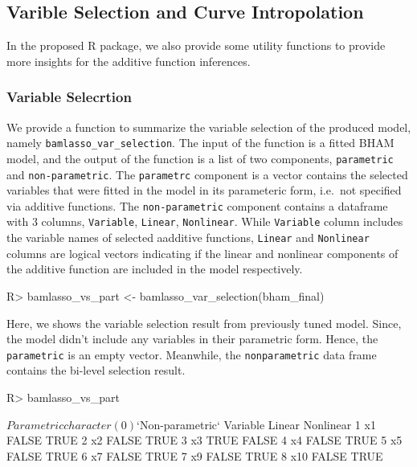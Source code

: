 \documentclass[
]{jss}
\begin{document}
\subsection{Varible Selection and Curve Intropolation}

In the proposed R package, we also provide some utility functions to
provide more insights for the additive function inferences.

\subsubsection{Variable Selecrtion}

We provide a function to summarize the variable selection of the
produced model, namely \texttt{bamlasso\_var\_selection}. The input of
the function is a fitted BHAM model, and the output of the function is a
list of two components, \texttt{parametric} and \texttt{non-parametric}.
The \texttt{parametrc} component is a vector contains the selected
variables that were fitted in the model in its parameteric form,
i.e.~not specified via additive functions. The \texttt{non-parametric}
component contains a dataframe with 3 columns, \texttt{Variable},
\texttt{Linear}, \texttt{Nonlinear}. While \texttt{Variable} column
includes the variable names of selected aadditive functions,
\texttt{Linear} and \texttt{Nonlinear} columns are logical vectors
indicating if the linear and nonlinear components of the additive
function are included in the model respectively.

\begin{CodeChunk}
\begin{CodeInput}
R> bamlasso_vs_part <- bamlasso_var_selection(bham_final)
\end{CodeInput}
\end{CodeChunk}

Here, we shows the variable selection result from previously tuned
model. Since, the model didn't include any variables in their parametric
form. Hence, the \texttt{parametric} is an empty vector. Meanwhile, the
\texttt{nonparametric} data frame contains the bi-level selection
result.

\begin{CodeChunk}
\begin{CodeInput}
R> bamlasso_vs_part
\end{CodeInput}
\begin{CodeOutput}
$Parametric
character(0)

$`Non-parametric`
  Variable Linear Nonlinear
1       x1  FALSE      TRUE
2       x2  FALSE      TRUE
3       x3   TRUE     FALSE
4       x4  FALSE      TRUE
5       x5  FALSE      TRUE
6       x7  FALSE      TRUE
7       x9  FALSE      TRUE
8      x10  FALSE      TRUE
\end{CodeOutput}
\end{CodeChunk}
\end{document}
